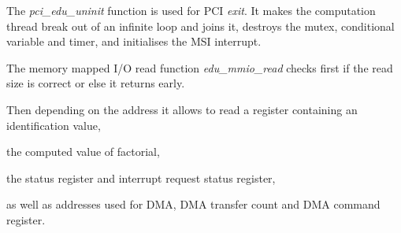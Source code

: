 \begin{codeblock}
    
\end{codeblock}

The \emph{pci\_edu\_uninit} function is used for PCI \emph{exit}. It makes the
computation thread break out of an infinite loop and joins it, destroys the
mutex, conditional variable and timer, and initialises the MSI interrupt.

\begin{codeblock}
    
\end{codeblock}

The memory mapped I/O read function \emph{edu\_mmio\_read} checks first if the
read size is correct or else it returns early.

\begin{codeblock}
    
\end{codeblock}

\noindent
Then depending on the address it allows to read a register containing an identification value,

\begin{codeblock}
    
\end{codeblock}

\noindent
the computed value of factorial,

\begin{codeblock}
    
\end{codeblock}

\noindent
the status register and interrupt request status register,

\begin{codeblock}
    
\end{codeblock}

\noindent
as well as addresses used for DMA, DMA transfer count and DMA command register.

\begin{codeblock}
    
\end{codeblock}

